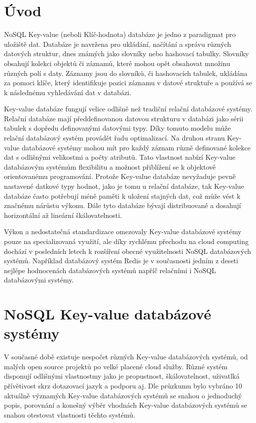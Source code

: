\documentclass[czech,bachelor,dept460,male,csharp,cpdeclaration]{diploma}
\begin{document}
	
	\MakeTitlePages
	
	\chapter{Úvod}
	
	NoSQL Key-value (neboli Klíč-hodnota) databáze\cite{wiki-key-value-db} je jedno z paradigmat pro uložiště dat. Databáze je navržena pro ukládání, načítání a správu různých datových struktur, dnes známých jako slovníky nebo hashovací tabulky. Slovníky obsahují kolekci objektů či záznamů, které mohou opět obsahovat množinu různých polí s daty. Záznamy jsou do slovníků, či hashovacích tabulek, ukládána za pomoci klíče, který identifikuje pozici záznamu v datové struktuře a používá se k následnému vyhledávání dat v databázi.
	
	Key-value databáze fungují velice odlišně než tradiční relační databázové systémy. Relační databáze mají předdefinovanou datovou strukturu v databázi jako sérii tabulek s dopředu definovanými datovými typy. Díky tomuto modelu může relační databázový systém provádět řadu optimalizací. Na druhou stranu Key-value databázové systémy mohou mít pro každý záznam různě definované kolekce dat s odlišnými velikostmi a počty atributů. Tato vlastnost nabízí Key-value databázovým systémům flexibilitu a možnost přiblížení se k objektově orientovanému programování. Protože Key-value databáze nevyžaduje pevně nastavené datkové typy hodnot, jako je tomu u relační databáze, tak Key-value databáze často potřebují méně paměti k uložení stajných dat, což může vést k značnému nárůstu výkonu. Dále tyto databáze bývají distribuované a dosahují horizontální až lineární škálovatelnosti.
	
	Výkon a nedostatečná standardizace omezovaly Key-value databázové systémy pouze na specializovaná využití, ale díky rychlému přechodu na cloud computing dochází v posledních letech k rozšíření obecné využitelnosti NoSQL databázových systémů. Například databázový systém Redis\cite{redis} je v současnosti jedním z deseti nejlépe hodnocenách\cite{db-engineers-ranking} databázových systémů napříč relačními i NoSQL databázovými systémy.
	
	\chapter{NoSQL Key-value databázové systémy}
	
	V současné době existuje nespočet různých Key-value databázových systémů, od malých open source projektů po velké placené cloud služby. Různé systém disponují odlišnými vlastnostmy jako je propustnost, škálovatelnost, uživatlká přívětivost skrz dotazovací jazyk a podporu aj. Dle průzkumu\cite{predictiveanalyticstoday}\cite{g2}\cite{db-engineers-ranking} bylo vybráno 10 aktuálně významých Key-value databázových systémů se snahou o jednoduchý popis, porovnání a konešný výběr vhodnách Key-value databázových systémů se snahou otestovat vlastnosti těchto systémů.
	
\end{document}
